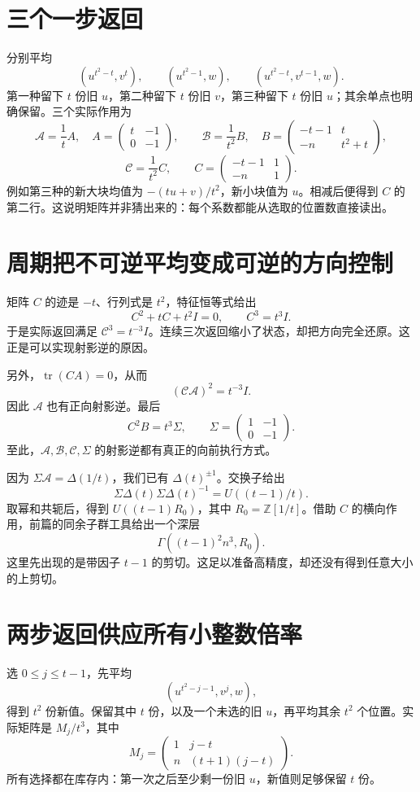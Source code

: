\documentclass[11pt,a4paper,oneside,openany]{book}
\newcommand{\Z}{\mathbb Z}\newcommand{\Q}{\mathbb Q}\newcommand{\F}{\mathbb F}\newcommand{\CC}{\mathbb C}
\theoremstyle{definition}\newtheorem{example}[theorem]{例}\newtheorem{conjecture}[theorem]{猜想}
\numberwithin{equation}{chapter}\setcounter{tocdepth}{1}
\begin{document}
\section{三个一步返回}
分别平均
\[(u^{t^2-t},v^t),\qquad(u^{t^2-1},w),\qquad
(u^{t^2-t},v^{t-1},w).
\]
第一种留下 $t$ 份旧 $u$，第二种留下 $t$ 份旧 $v$，第三种留下 $t$ 份旧 $u$；其余单点也明确保留。三个实际作用为
\[
\mathcal A=\frac1t A,\quad A=\begin{pmatrix}t&-1\\0&-1\end{pmatrix},\qquad
\mathcal B=\frac1{t^2}B,\quad B=\begin{pmatrix}-t-1&t\\-n&t^2+t\end{pmatrix},
\]
\[
\mathcal C=\frac1{t^2}C,\qquad C=\begin{pmatrix}-t-1&1\\-n&1\end{pmatrix}.
\]
例如第三种的新大块均值为 $-(tu+v)/t^2$，新小块值为 $u$。相减后便得到 $C$ 的第二行。这说明矩阵并非猜出来的：每个系数都能从选取的位置数直接读出。

\section{周期把不可逆平均变成可逆的方向控制}
矩阵 $C$ 的迹是 $-t$、行列式是 $t^2$，特征恒等式给出
\[C^2+tC+t^2I=0,\qquad C^3=t^3I.
\]
于是实际返回满足 $\mathcal C^3=t^{-3}I$。连续三次返回缩小了状态，却把方向完全还原。这正是可以实现射影逆的原因。

另外，$\operatorname{tr}(CA)=0$，从而
\[(\mathcal C\mathcal A)^2=t^{-3}I.
\]
因此 $\mathcal A$ 也有正向射影逆。最后
\[C^2B=t^3\Sigma,\qquad
\Sigma=\begin{pmatrix}1&-1\\0&-1\end{pmatrix}.
\]
至此，$\mathcal A,\mathcal B,\mathcal C,\Sigma$ 的射影逆都有真正的向前执行方式。

因为 $\Sigma\mathcal A=\Delta(1/t)$，我们已有 $\Delta(t)^{\pm1}$。交换子给出
\[\Sigma\Delta(t)\Sigma\Delta(t)^{-1}=U((t-1)/t).
\]
取幂和共轭后，得到 $U((t-1)R_0)$，其中 $R_0=\Z[1/t]$。借助 $C$ 的横向作用，前篇的同余子群工具给出一个深层
\[\Gamma((t-1)^2n^3,R_0).
\]
这里先出现的是带因子 $t-1$ 的剪切。这足以准备高精度，却还没有得到任意大小的上剪切。

\section{两步返回供应所有小整数倍率}
选 $0\le j\le t-1$，先平均
\[(u^{t^2-j-1},v^j,w),
\]
得到 $t^2$ 份新值。保留其中 $t$ 份，以及一个未选的旧 $u$，再平均其余 $t^2$ 个位置。实际矩阵是 $M_j/t^3$，其中
\[M_j=\begin{pmatrix}1&j-t\\n&(t+1)(j-t)\end{pmatrix}.
\]
所有选择都在库存内：第一次之后至少剩一份旧 $u$，新值则足够保留 $t$ 份。
\end{document}
